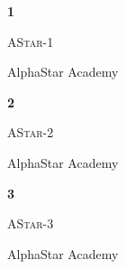 \documentclass[extrafontsizes,30pt]{memoir}
\begin{document}
\newcommand{\TeamID}{1}
\newcommand{\TeamName}{AStar-1}
\newcommand{\SchoolName}{AlphaStar Academy}

\begin{center}
\mbox{}
\vspace{1in}

{\Huge \textbf{ \TeamID}}

\vspace{1in}

{\Large \textsc{\TeamName}}

\vspace{1in}

{\large \SchoolName}
\end{center}

\newpage



\renewcommand{\TeamID}{2}
\renewcommand{\TeamName}{AStar-2}
\renewcommand{\SchoolName}{AlphaStar Academy}

\begin{center}
\mbox{}
\vspace{1in}

{\Huge \textbf{ \TeamID}}

\vspace{1in}

{\Large \textsc{\TeamName}}

\vspace{1in}

{\large \SchoolName}
\end{center}

\newpage



\renewcommand{\TeamID}{3}
\renewcommand{\TeamName}{AStar-3}
\renewcommand{\SchoolName}{AlphaStar Academy}

\begin{center}
\mbox{}
\vspace{1in}

{\Huge \textbf{ \TeamID}}

\vspace{1in}

{\Large \textsc{\TeamName}}

\vspace{1in}

{\large \SchoolName}
\end{center}

\newpage



\renewcommand{\TeamID}{4}
\renewcommand{\TeamName}{AStar-4}
\renewcommand{\SchoolName}{AlphaStar Academy}
\end{document}
